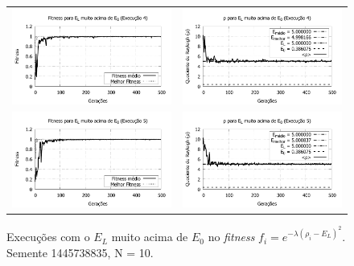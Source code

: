 \begin{figure}[p]
\begin{tabular}{@{}cc@{}}
		\includegraphics[width=.40\textwidth]{figs/resultados/variandoEL/T3E4_fitness.pdf} &
    \includegraphics[width=.40\textwidth]{figs/resultados/variandoEL/T3E4_rho.pdf}   \\
		
		\includegraphics[width=.40\textwidth]{figs/resultados/variandoEL/T3E5_fitness.pdf} &
    \includegraphics[width=.40\textwidth]{figs/resultados/variandoEL/T3E5_rho.pdf}
		
  \end{tabular}
  \caption{Execuções com o $E_L$ muito acima de $E_0$ no \textit{fitness} $f_i = e^{-\lambda(\rho_i - E_L)^2}$. Semente 1445738835, N = 10.}
	\label{fig:variando_EL_muito_acima}
	\end{figure}

